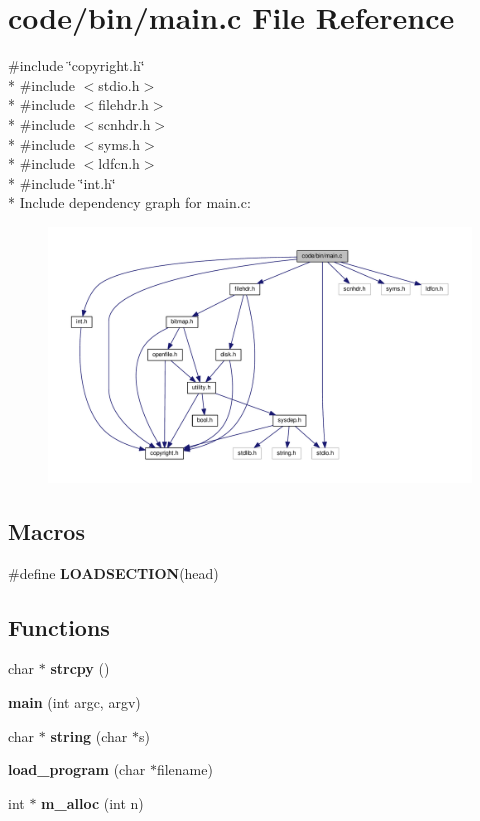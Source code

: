 \section{code/bin/main.c File Reference}
\label{main_8c}
{\ttfamily \#include \char`\"{}copyright.\+h\char`\"{}}\\*
{\ttfamily \#include $<$stdio.\+h$>$}\\*
{\ttfamily \#include $<$filehdr.\+h$>$}\\*
{\ttfamily \#include $<$scnhdr.\+h$>$}\\*
{\ttfamily \#include $<$syms.\+h$>$}\\*
{\ttfamily \#include $<$ldfcn.\+h$>$}\\*
{\ttfamily \#include \char`\"{}int.\+h\char`\"{}}\\*
Include dependency graph for main.\+c\+:
\nopagebreak
\begin{figure}[H]
\begin{center}
\leavevmode
\includegraphics[width=350pt]{main_8c__incl}
\end{center}
\end{figure}
\subsection*{Macros}
\begin{DoxyCompactItemize}
\item 
\#define {\bf L\+O\+A\+D\+S\+E\+C\+T\+I\+ON}(head)
\end{DoxyCompactItemize}
\subsection*{Functions}
\begin{DoxyCompactItemize}
\item 
char $\ast$ {\bf strcpy} ()
\item 
{\bf main} (int argc, argv)
\item 
char $\ast$ {\bf string} (char $\ast$s)
\item 
{\bf load\+\_\+program} (char $\ast$filename)
\item 
int $\ast$ {\bf m\+\_\+alloc} (int n)
\end{DoxyCompactItemize}
